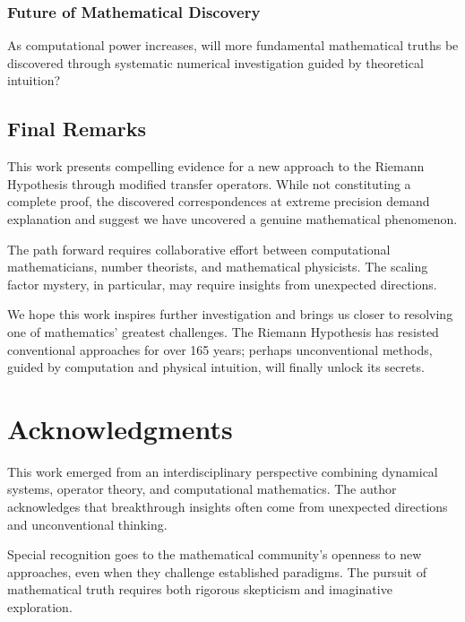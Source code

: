 \documentclass[12pt,letterpaper]{article}
\theoremstyle{plain}
\theoremstyle{definition}
\theoremstyle{remark}
\begin{document}
\subsubsection{Future of Mathematical Discovery}
As computational power increases, will more fundamental mathematical truths be discovered through systematic numerical investigation guided by theoretical intuition?

\subsection{Final Remarks}

This work presents compelling evidence for a new approach to the Riemann Hypothesis through modified transfer operators. While not constituting a complete proof, the discovered correspondences at extreme precision demand explanation and suggest we have uncovered a genuine mathematical phenomenon.

The path forward requires collaborative effort between computational mathematicians, number theorists, and mathematical physicists. The scaling factor mystery, in particular, may require insights from unexpected directions.

We hope this work inspires further investigation and brings us closer to resolving one of mathematics' greatest challenges. The Riemann Hypothesis has resisted conventional approaches for over 165 years; perhaps unconventional methods, guided by computation and physical intuition, will finally unlock its secrets.

\section*{Acknowledgments}

This work emerged from an interdisciplinary perspective combining dynamical systems, operator theory, and computational mathematics. The author acknowledges that breakthrough insights often come from unexpected directions and unconventional thinking.

Special recognition goes to the mathematical community's openness to new approaches, even when they challenge established paradigms. The pursuit of mathematical truth requires both rigorous skepticism and imaginative exploration.
\end{document}
